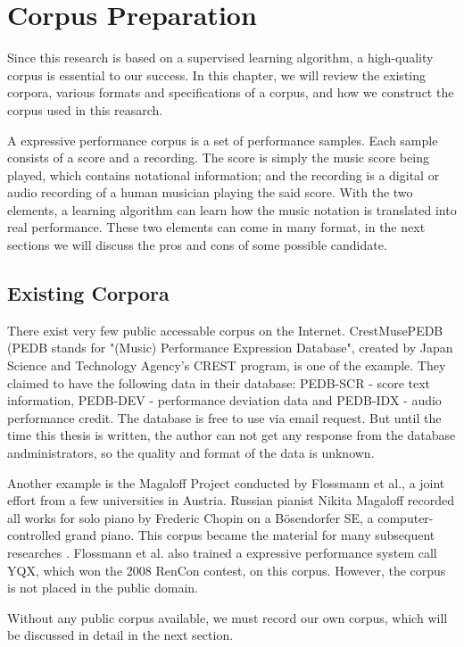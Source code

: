 \chapter{Corpus Preparation}
\label{chap:corpus}
Since this research is based on a supervised learning algorithm, a high-quality corpus is essential to our success. In this chapter, we will review the existing corpora, various formats and specifications of a corpus, and how we construct the corpus used in this reasarch.

A expressive performance corpus is a set of performance samples. Each sample consists of a score and a recording. The score is simply the music score being played, which contains notational information; and the recording is a digital or audio recording of a human musician playing the said score. With the two elements, a learning algorithm can learn how the music notation is translated into real performance. These two elements can come in many format, in the next sections we will discuss the pros and cons of some possible candidate.
\section{Existing Corpora} 
There exist very few public accessable corpus on the Internet. CrestMusePEDB\cite{crestmuse} (PEDB stands for "(Music) Performance Expression Database", created by Japan Science and Technology Agency's CREST program, is one of the example. They claimed to have the following data in their database: PEDB-SCR - score text information, PEDB-DEV - performance deviation data and PEDB-IDX - audio performance credit. The database is free to use via email request. But until the time this thesis is written, the author can not get any response from the database andministrators, so the quality and format of the data is unknown.

Another example is the Magaloff Project\cite{magaloff} conducted by Flossmann et al., a joint effort from a few universities in Austria.  Russian pianist Nikita Magaloff recorded all works for solo piano by Frederic Chopin on a Bösendorfer SE, a computer-controlled grand piano. This corpus became the material for many subsequent researches \cite{magaloff extendedi}. Flossmann et al. also trained a expressive performance system call YQX\cite{yqx}, which won the 2008 RenCon contest, on this corpus. However, the corpus is not placed in the public domain. 

Without any public corpus available, we must record our own corpus, which will be discussed in detail in the next section.


